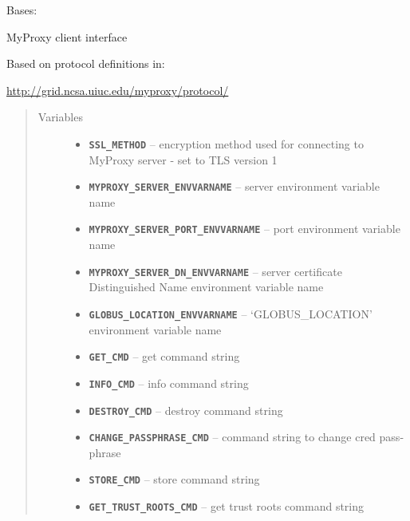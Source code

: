 \documentclass[letterpaper,10pt,english]{sphinxmanual}
\begin{document}
\begin{fulllineitems}
\label{client:myproxy.client.MyProxyClient}
Bases: 

MyProxy client interface

Based on protocol definitions in:

\href{http://grid.ncsa.uiuc.edu/myproxy/protocol/}{http://grid.ncsa.uiuc.edu/myproxy/protocol/}
\begin{quote}\begin{description}
\item[{Variables}] \leavevmode\begin{itemize}
\item {} 
\textbf{\texttt{SSL\_METHOD}} -- encryption method used for connecting to MyProxy server - set to TLS version 1

\item {} 
\textbf{\texttt{MYPROXY\_SERVER\_ENVVARNAME}} -- server environment variable name

\item {} 
\textbf{\texttt{MYPROXY\_SERVER\_PORT\_ENVVARNAME}} -- port environment variable name

\item {} 
\textbf{\texttt{MYPROXY\_SERVER\_DN\_ENVVARNAME}} -- server certificate Distinguished Name environment variable name

\item {} 
\textbf{\texttt{GLOBUS\_LOCATION\_ENVVARNAME}} -- `GLOBUS\_LOCATION' environment variable name

\item {} 
\textbf{\texttt{GET\_CMD}} -- get command string

\item {} 
\textbf{\texttt{INFO\_CMD}} -- info command string

\item {} 
\textbf{\texttt{DESTROY\_CMD}} -- destroy command string

\item {} 
\textbf{\texttt{CHANGE\_PASSPHRASE\_CMD}} -- command string to change cred pass-phrase

\item {} 
\textbf{\texttt{STORE\_CMD}} -- store command string

\item {} 
\textbf{\texttt{GET\_TRUST\_ROOTS\_CMD}} -- get trust roots command string


\end{itemize}
\end{description}
\end{quote}
\end{fulllineitems}
\end{document}
